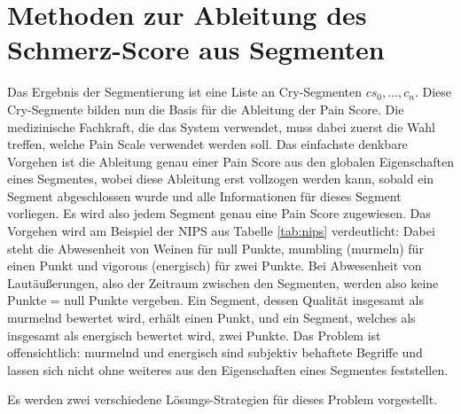 \section{Methoden zur Ableitung des Schmerz-Score aus Segmenten}
\label{sec:overviewPainRegression}

Das Ergebnis der Segmentierung ist eine Liste an Cry-Segmenten $cs_0,  \ldots , c_n$. Diese Cry-Segmente bilden nun die Basis für die Ableitung der Pain Score. Die medizinische Fachkraft, die das System verwendet, muss dabei zuerst die Wahl treffen, welche Pain Scale verwendet werden soll. Das einfachste denkbare Vorgehen ist die Ableitung genau einer Pain Score aus den globalen Eigenschaften eines Segmentes, wobei diese Ableitung erst vollzogen werden kann, sobald ein Segment abgeschlossen wurde und alle Informationen für dieses Segment vorliegen. Es wird also jedem Segment genau eine Pain Score zugewiesen. Das Vorgehen wird am Beispiel der NIPS aus Tabelle \ref{tab:nips} verdeutlicht: Dabei steht die Abwesenheit von Weinen für null Punkte, \glqq mumbling\grqq{} (murmeln) für einen Punkt und \glqq vigorous\grqq{} (energisch) für zwei Punkte. Bei Abwesenheit von Lautäußerungen, also der Zeitraum zwischen den Segmenten, werden also keine Punkte = null Punkte vergeben. Ein Segment, dessen Qualität insgesamt als \glqq murmelnd\grqq{} bewertet wird, erhält einen Punkt, und ein Segment, welches als insgesamt als \glqq energisch\grqq{} bewertet wird, zwei Punkte. Das Problem ist offensichtlich: \glqq murmelnd\grqq{} und \glqq energisch\grqq{} sind subjektiv behaftete Begriffe und lassen sich nicht ohne weiteres aus den Eigenschaften eines Segmentes feststellen. 

Es werden zwei verschiedene Lösungs-Strategien für dieses Problem vorgestellt. 

\vspace{5mm}

